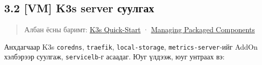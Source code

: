 \hypertarget{vm-k3s-server-ux441ux443ux443ux43bux433ux430ux445}{%
\subsection{3.2 {[}VM{]} K3s server суулгах}\label{vm-k3s-server-ux441ux443ux443ux43bux433ux430ux445}}

\begin{quote}
Албан ёсны баримт: \href{https://docs.k3s.io/quick-start}{K3s Quick-Start} · \href{https://docs.k3s.io/installation/packaged-components}{Managing Packaged Components}
\end{quote}

\begin{Shaded}
\begin{Highlighting}[]
\KeywordTok{|} \KeywordTok{\textbackslash{}}
  \KeywordTok{\textbackslash{}}
  \KeywordTok{\textbackslash{}}
\end{Highlighting}
\end{Shaded}

Анхдагчаар K3s \texttt{coredns}, \texttt{traefik}, \texttt{local-storage}, \texttt{metrics-server}-ийг AddOn хэлбэрээр суулгаж, \texttt{servicelb}-г асаадаг. Юуг үлдээж, юуг унтраах вэ:


